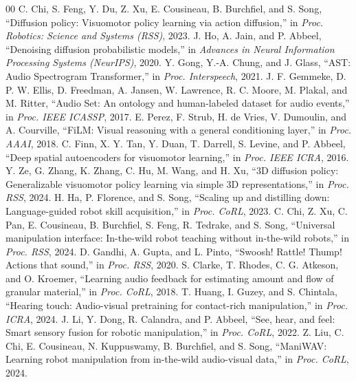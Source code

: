 \documentclass[conference]{IEEEtran}
\begin{document}
\begin{thebibliography}{00}
 C. Chi, S. Feng, Y. Du, Z. Xu, E. Cousineau, B. Burchfiel, and S. Song, ``Diffusion policy: Visuomotor policy learning via action diffusion,'' in \textit{Proc. Robotics: Science and Systems (RSS)}, 2023.
 J. Ho, A. Jain, and P. Abbeel, ``Denoising diffusion probabilistic models,'' in \textit{Advances in Neural Information Processing Systems (NeurIPS)}, 2020.
 Y. Gong, Y.-A. Chung, and J. Glass, ``AST: Audio Spectrogram Transformer,'' in \textit{Proc. Interspeech}, 2021.
 J. F. Gemmeke, D. P. W. Ellis, D. Freedman, A. Jansen, W. Lawrence, R. C. Moore, M. Plakal, and M. Ritter, ``Audio Set: An ontology and human-labeled dataset for audio events,'' in \textit{Proc. IEEE ICASSP}, 2017.
 E. Perez, F. Strub, H. de Vries, V. Dumoulin, and A. Courville, ``FiLM: Visual reasoning with a general conditioning layer,'' in \textit{Proc. AAAI}, 2018.
 C. Finn, X. Y. Tan, Y. Duan, T. Darrell, S. Levine, and P. Abbeel, ``Deep spatial autoencoders for visuomotor learning,'' in \textit{Proc. IEEE ICRA}, 2016.
 Y. Ze, G. Zhang, K. Zhang, C. Hu, M. Wang, and H. Xu, ``3D diffusion policy: Generalizable visuomotor policy learning via simple 3D representations,'' in \textit{Proc. RSS}, 2024.
 H. Ha, P. Florence, and S. Song, ``Scaling up and distilling down: Language-guided robot skill acquisition,'' in \textit{Proc. CoRL}, 2023.
 C. Chi, Z. Xu, C. Pan, E. Cousineau, B. Burchfiel, S. Feng, R. Tedrake, and S. Song, ``Universal manipulation interface: In-the-wild robot teaching without in-the-wild robots,'' in \textit{Proc. RSS}, 2024.
 D. Gandhi, A. Gupta, and L. Pinto, ``Swoosh! Rattle! Thump! Actions that sound,'' in \textit{Proc. RSS}, 2020.
 S. Clarke, T. Rhodes, C. G. Atkeson, and O. Kroemer, ``Learning audio feedback for estimating amount and flow of granular material,'' in \textit{Proc. CoRL}, 2018.
 T. Huang, I. Guzey, and S. Chintala, ``Hearing touch: Audio-visual pretraining for contact-rich manipulation,'' in \textit{Proc. ICRA}, 2024.
 J. Li, Y. Dong, R. Calandra, and P. Abbeel, ``See, hear, and feel: Smart sensory fusion for robotic manipulation,'' in \textit{Proc. CoRL}, 2022.
 Z. Liu, C. Chi, E. Cousineau, N. Kuppuswamy, B. Burchfiel, and S. Song, ``ManiWAV: Learning robot manipulation from in-the-wild audio-visual data,'' in \textit{Proc. CoRL}, 2024.
\end{thebibliography}
\end{document}
